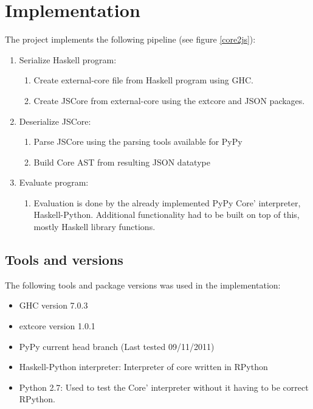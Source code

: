 
\section{Implementation}


The project implements the following pipeline (see figure \ref{core2js}):
\begin{enumerate}
\item Serialize Haskell program: 
  \begin{enumerate}
  \item Create external-core file from Haskell program using GHC.
  \item Create JSCore from external-core using the extcore and JSON packages.
  \end{enumerate}
\item Deserialize JSCore:
  \begin{enumerate}
  \item Parse JSCore using the parsing tools available for PyPy
  \item Build Core AST from resulting JSON datatype
  \end{enumerate}
\item Evaluate program:
  \begin{enumerate}
  \item Evaluation is done by the already implemented PyPy Core' interpreter,
  Haskell-Python. Additional functionality had to be built on top of this, mostly 
  Haskell library functions.
  \end {enumerate}
\end{enumerate}

\subsection{Tools and versions}

The following tools and package versions was used in the implementation:

\begin{itemize}
\item GHC version 7.0.3
\item extcore version 1.0.1
\item PyPy current head branch (Last tested 09/11/2011)
\item Haskell-Python interpreter: Interpreter of core written in RPython
\item Python 2.7: Used to test the Core' interpreter without it having to be correct RPython.
\end{itemize}

